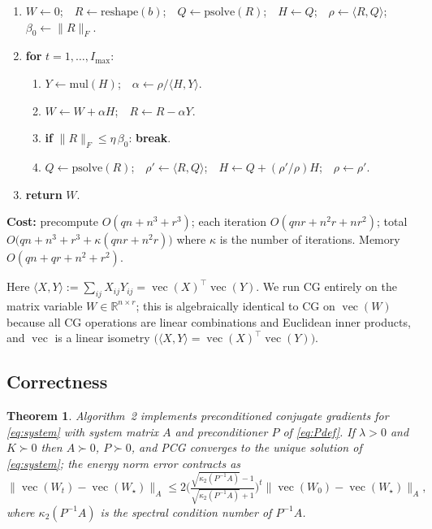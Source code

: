 \documentclass[12pt]{article}
\DeclareMathOperator{\vecop}{vec}
\newcommand{\bR}{\mathbb{R}}
\newtheorem{theorem}{Theorem}
\begin{document}
\begin{center}
{{\begin{enumerate}[leftmargin=2.2em,itemsep=1pt]
  \item $W\!\leftarrow\!0$;\ \ $R\!\leftarrow\!\mathrm{reshape}(b)$;\ \
    $Q\!\leftarrow\!\mathrm{psolve}(R)$;\ \ $H\!\leftarrow\!Q$;\ \
    $\rho\!\leftarrow\!\langle R,Q\rangle$;\ \ $\beta_0\!\leftarrow\!\|R\|_F$.
  \item \textbf{for} $t=1,\dots,I_{\max}$:
    \begin{enumerate}[leftmargin=1.4em,itemsep=1pt]
      \item $Y\!\leftarrow\!\mathrm{mul}(H)$;\ \
        $\alpha\!\leftarrow\!\rho/\langle H,Y\rangle$.
      \item $W\!\leftarrow\!W+\alpha H$;\ \ $R\!\leftarrow\!R-\alpha Y$.
      \item \textbf{if} $\|R\|_F\le\eta\,\beta_0$: \textbf{break}.
      \item $Q\!\leftarrow\!\mathrm{psolve}(R)$;\ \
        $\rho'\!\leftarrow\!\langle R,Q\rangle$;\ \
        $H\!\leftarrow\!Q+(\rho'/\rho)H$;\ \ $\rho\!\leftarrow\!\rho'$.
    \end{enumerate}
  \item \textbf{return} $W$.
\end{enumerate}
\textbf{Cost:} precompute $O(qn+n^3+r^3)$;
each iteration $O(qnr+n^2r+nr^2)$; total
$O\!\big(qn+n^3+r^3+\kappa(qnr+n^2r)\big)$ where $\kappa$ is the number of
iterations. Memory $O(qn+qr+n^2+r^2)$.}}
\end{center}

Here $\langle X,Y\rangle:=\sum_{ij}X_{ij}Y_{ij}=\vecop(X)^{\top}\vecop(Y)$.
We run CG entirely on the matrix variable $W\in\bR^{n\times r}$; this is
algebraically identical to CG on $\vecop(W)$ because all CG operations are
linear combinations and Euclidean inner products, and $\vecop$ is a linear
isometry $\big(\langle X,Y\rangle=\vecop(X)^{\top}\vecop(Y)\big)$.

\subsection{Correctness}

\begin{theorem}\label{thm:correct}
Algorithm~2 implements preconditioned conjugate gradients for
\eqref{eq:system} with system matrix $A$ and preconditioner $P$ of
\eqref{eq:Pdef}. If $\lambda>0$ and $K\succ0$ then $A\succ0$, $P\succ0$,
and PCG converges to the unique solution of \eqref{eq:system}; the energy
norm error contracts as
\begin{equation}\label{eq:cgrate}
  \|\vecop(W_t)-\vecop(W_\star)\|_A
  \le 2\Big(\tfrac{\sqrt{\kappa_2(P^{-1}A)}-1}
                 {\sqrt{\kappa_2(P^{-1}A)}+1}\Big)^{t}
        \|\vecop(W_0)-\vecop(W_\star)\|_A,
\end{equation}
where $\kappa_2(P^{-1}A)$ is the spectral condition number of $P^{-1}A$.
\end{theorem}
\end{document}
